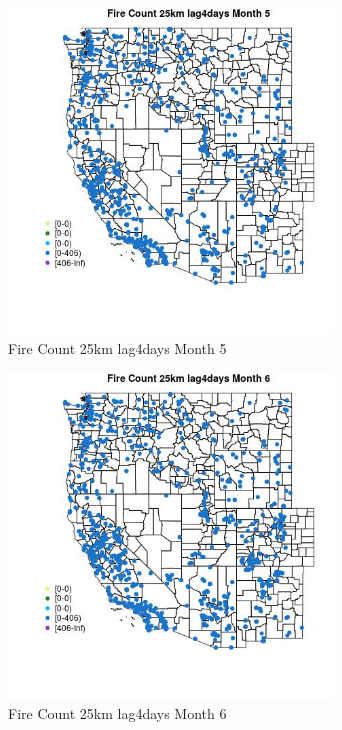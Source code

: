 \begin{figure} 
\centering  
\includegraphics[width=0.77\textwidth]{Code_Outputs/Report_ML_input_PM25_Step4_part_f_de_duplicated_aveswNAs_MapObsMo5Fire_Count_25km_lag4days.jpg} 
\caption{\label{fig:Report_ML_input_PM25_Step4_part_f_de_duplicated_aveswNAsMapObsMo5Fire_Count_25km_lag4days}Fire Count 25km lag4days Month 5} 
\end{figure} 
 

\clearpage 

\begin{figure} 
\centering  
\includegraphics[width=0.77\textwidth]{Code_Outputs/Report_ML_input_PM25_Step4_part_f_de_duplicated_aveswNAs_MapObsMo6Fire_Count_25km_lag4days.jpg} 
\caption{\label{fig:Report_ML_input_PM25_Step4_part_f_de_duplicated_aveswNAsMapObsMo6Fire_Count_25km_lag4days}Fire Count 25km lag4days Month 6} 
\end{figure} 
 

